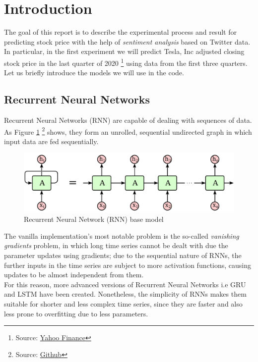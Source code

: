 \documentclass[12pt]{article}
\begin{document}


\section{Introduction}

The goal of this report is to describe the experimental process and result for predicting stock price with the help of \textit{sentiment analysis} based on Twitter data. In particular, in the first experiment we will predict Tesla, Inc adjusted closing stock price in the last quarter of 2020 \footnote{Source: \href{https://finance.yahoo.com/quote/TSLA/}{Yahoo Finance}} using data from the first three quarters.\\
Let us briefly introduce the models we will use in the code.

\subsection{Recurrent Neural Networks}
\label{sec:rnn}
Recurrent Neural Networks (RNN) \cite{zaremba2014recurrent} are capable of dealing with sequences of data. As Figure \ref{fig:rnn} \footnote{Source: \href{https://kvitajakub.github.io/2016/04/14/rnn-diagrams/}{Github}}  shows, they form an unrolled, sequential undirected graph in which input data are fed sequentially.
\begin{figure}[h!]
    \centering
    \includegraphics[width=0.7\linewidth]{images/rnn.pdf}
    \caption{Recurrent Neural Network (RNN) base model}
    \label{fig:rnn}
\end{figure}
The vanilla implementation's most notable problem is the so-called \textit{vanishing gradients} problem, in which long time series cannot be dealt with due the parameter updates using gradients; due to the sequential nature of RNNs, the further inputs in the time series are subject to more activation functions, causing updates to be almost independent from them.\\
For this reason, more advanced versions of Recurrent Neural Networks i.e GRU and LSTM have been created. Nonetheless, the simplicity of RNNs makes them suitable for shorter and less complex time series, since they are faster and also less prone to overfitting due to less parameters.
\end{document}

